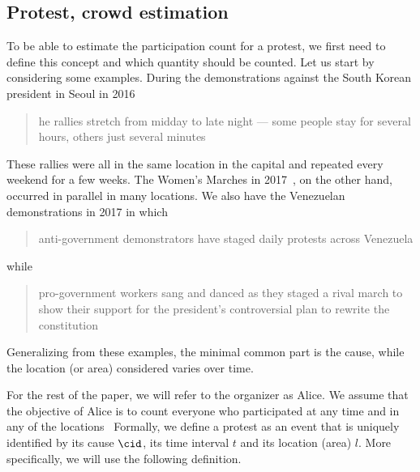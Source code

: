 \subsection{Protest,  crowd estimation}%
\label{protest-model}


To be able to estimate the participation count for a protest, we first need to define this concept and which quantity should be counted.
Let us start by considering some examples.
During the demonstrations against the South Korean president in Seoul in 2016
\blockcquote{2016DemonstrationsInSeoul}{%
  he rallies stretch from midday to late night --- some people stay for several hours, others just several minutes%
}.
These rallies were all in the same location in the capital and repeated every weekend for a few weeks.
The Women's Marches in 2017~\cite{2017WomensMarchesInUS}, on the other hand, occurred in parallel in many locations.
We also have the Venezuelan demonstrations in 2017 in which \blockcquote{2017VenezuelaProtestFrequency}{%
  anti-government demonstrators have staged daily protests across Venezuela%
} while
\blockcquote{AlJazeeraOnVenezuela2017}{%
  pro-government workers sang and danced as they staged a rival march to show their support for the president's controversial plan to rewrite the constitution%
}.
Generalizing from these examples, the minimal common part is the cause,\label{CauseIsTheCommonDenominator} while the location (or area) considered varies over time.

For the rest of the paper, we will refer to the organizer as Alice.
We assume that the objective of Alice is to count everyone who participated at any time and in any of the locations~\cite{2016DemonstrationsInSeoul} %
Formally, we define a protest as an event that is uniquely identified by its cause \(\cid\), its time interval \(t\) and its location (area) \(l\).
More specifically, we will use the following definition.

